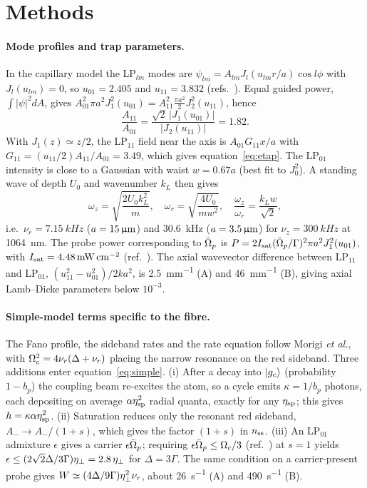 \documentclass[10pt,twocolumn,a4paper]{article}
\begin{document}
\section{Methods}
\paragraph{Mode profiles and trap parameters.}
In the capillary model the LP$_{lm}$ modes are $\psi_{lm}=A_{lm}J_l(u_{lm}r/a)\cos l\phi$ with $J_l(u_{lm})=0$, so $u_{01}=2.405$ and $u_{11}=3.832$ (refs.~). Equal guided power, $\int|\psi|^2dA$, gives $A_{01}^2\pi a^2J_1^2(u_{01})=A_{11}^2\tfrac{\pi a^2}{2}J_2^2(u_{11})$, hence
\begin{equation}
  \frac{A_{11}}{A_{01}}=\frac{\sqrt2\,|J_1(u_{01})|}{|J_2(u_{11})|}=1.82 .
\end{equation}
With $J_1(z)\simeq z/2$, the LP$_{11}$ field near the axis is $A_{01}G_{11}x/a$ with $G_{11}=(u_{11}/2)A_{11}/A_{01}=3.49$, which gives equation~\eqref{eq:etap}. The LP$_{01}$ intensity is close to a Gaussian with waist $w=0.67a$ (best fit to $J_0^2$). A standing wave of depth $U_0$ and wavenumber $k_L$ then gives
\begin{equation}
  \omega_z=\sqrt{\frac{2U_0k_L^2}{m}},\quad \omega_r=\sqrt{\frac{4U_0}{mw^2}},\quad \frac{\omega_z}{\omega_r}=\frac{k_Lw}{\sqrt2},
\end{equation}
i.e.\ $\nu_r=\SI{7.15}{kHz}$ ($a=15\,\upmu\mathrm{m}$) and \SI{30.6}{kHz} ($a=3.5\,\upmu\mathrm{m}$) for $\nu_z=\SI{300}{kHz}$ at \SI{1064}{nm}. The probe power corresponding to $\bar{\Omega}_p$ is $P=2I_{\rm sat}(\bar{\Omega}_p/\Gamma)^2\pi a^2J_1^2(u_{01})$, with $I_{\rm sat}=4.48\,\mathrm{mW\,cm^{-2}}$ (ref.~). The axial wavevector difference between LP$_{11}$ and LP$_{01}$, $(u_{11}^2-u_{01}^2)/2ka^2$, is \SI{2.5}{mm^{-1}} (A) and \SI{46}{mm^{-1}} (B), giving axial Lamb--Dicke parameters below $10^{-3}$.

\paragraph{Simple-model terms specific to the fibre.}
The Fano profile, the sideband rates and the rate equation follow Morigi \emph{et al.}\cite{morigi2000}, with $\Omega_c^2=4\nu_r(\Delta+\nu_r)$ placing the narrow resonance on the red sideband. Three additions enter equation~\eqref{eq:simple}. (i) After a decay into $|g_c\rangle$ (probability $1-b_p$) the coupling beam re-excites the atom, so a cycle emits $\kappa=1/b_p$ photons, each depositing on average $\alpha\eta_{\rm sp}^2$ radial quanta, exactly for any $\eta_{\rm sp}$; this gives $h=\kappa\alpha\eta_{\rm sp}^2$. (ii) Saturation reduces only the resonant red sideband, $A_-\to A_-/(1+s)$, which gives the factor $(1+s)$ in $n_{\rm ss}$. (iii) An LP$_{01}$ admixture $\epsilon$ gives a carrier $\epsilon\bar{\Omega}_p$; requiring $\epsilon\bar{\Omega}_p\le\Omega_c/3$ (ref.~) at $s=1$ yields $\epsilon\le(2\sqrt2\Delta/3\Gamma)\eta_{\perp}=2.8\,\eta_{\perp}$ for $\Delta=3\Gamma$. The same condition on a carrier-present probe gives $W\simeq(4\Delta/9\Gamma)\eta_{\perp}^2\nu_r$, about \SI{26}{s^{-1}} (A) and \SI{490}{s^{-1}} (B).
\end{document}
